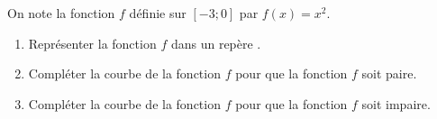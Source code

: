 
On note la fonction $f$ définie sur $[-3;0]$ par $f(x)=x^2$.
\begin{enumerate}
\item Représenter la fonction $f$ dans un repère \Oij.
\item Compléter la courbe de la fonction $f$ pour que la fonction $f$ soit paire. 
\item Compléter la courbe de la fonction $f$ pour que la fonction $f$ soit impaire. 
\end{enumerate}